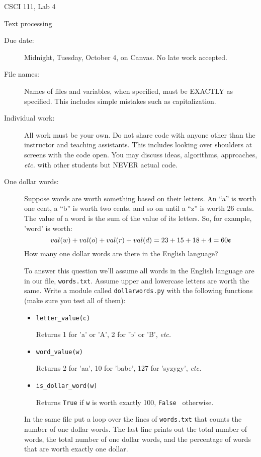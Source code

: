 \documentclass[12pt]{article}
\begin{document}
\sloppy
\centerline{\Large CSCI 111, Lab 4}
\centerline{\large Text processing}

\begin{description}
\item[Due date:] Midnight, Tuesday, October 4, on Canvas.
No late work accepted.  

\item[File names:]  Names of files and variables, when specified,
must be EXACTLY as specified.  This includes simple mistakes such
as capitalization.

\item[Individual work:]  All work must be your own.  Do not share
code with anyone other than the instructor and teaching assistants.
This includes looking over shoulders at screens with the code open.
You may discuss ideas, algorithms, approaches, {\em etc.} with
other students but NEVER actual code.

\item[One dollar words:] Suppose words are worth something
based on their letters.  An ``a'' is worth one cent, a ``b''
is worth two cents, and so on until a ``z'' is worth 26 cents.
The value of a word is the sum of the value of its letters.
So, for example, 'word' is worth:
\[
val(w) + val(o) + val(r) + val(d) = 23 + 15 + 18 + 4 = 60 \mbox{\textcent}
\]
How many one dollar words are there in the English language?

To answer this question we'll assume all words in the English
language are in our file, \lstinline{words.txt}.  Assume upper and 
lowercase letters are worth the same.  Write a module
called \lstinline{dollarwords.py} with the
following functions (make sure you test all of them):
\begin{itemize}
\item \lstinline{letter_value(c)} 

Returns 1 for 'a' or 'A', 2 for 'b' or 'B', {\em etc.}

\item \lstinline{word_value(w)}

Returns 2 for 'aa', 10 for 'babe', 127 for 'syzygy', {\em etc.}

\item \lstinline{is_dollar_word(w)}

Returns \lstinline{True} if \lstinline{w} is worth exactly 100, \lstinline{False } otherwise.

\end{itemize}

In the same file put a loop over the lines of {\tt words.txt}
that counts the number of one dollar words.  The last line
prints out the total number of words, the total number of one dollar
words, and the percentage of words that are worth exactly one dollar.


\end{description}
\end{document}

